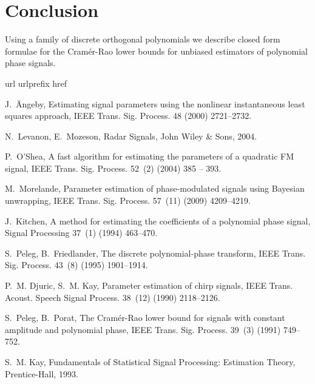 \documentclass[review]{elsarticle}
\begin{document}
 
\section{Conclusion}

Using a family of discrete orthogonal polynomials we describe closed form formulae for the Cram\'{e}r-Rao lower bounds for unbiased estimators of polynomial phase signals.



\small 
%

\begin{thebibliography}{10}
\expandafter\ifx\csname url\endcsname\relax
  \def\url#1{\texttt{#1}}\fi
\expandafter\ifx\csname urlprefix\endcsname\relax\def\urlprefix{URL }\fi
\expandafter\ifx\csname href\endcsname\relax
  \def\href#1#2{#2} \def\path#1{#1}\fi

J.~\"Angeby, Estimating signal parameters using the nonlinear instantaneous
  least squares approach, IEEE Trans. Sig. Process. 48 (2000) 2721--2732.

N.~Levanon, E.~Mozeson, Radar Signals, John Wiley \& Sons, 2004.

P.~O'Shea, A fast algorithm for estimating the parameters of a quadratic {FM}
  signal, IEEE Trans. Sig. Process. 52~(2) (2004) 385 -- 393.

M.~Morelande, Parameter estimation of phase-modulated signals using {Bayesian}
  unwrapping, IEEE Trans. Sig. Process. 57~(11) (2009) 4209--4219.

J.~Kitchen, A method for estimating the coefficients of a polynomial phase
  signal, Signal Processing 37~(1) (1994) 463--470.

S.~Peleg, B.~Friedlander, The discrete polynomial-phase transform, IEEE Trans.
  Sig. Process. 43~(8) (1995) 1901--1914.

P.~M. Djuric, S.~M. Kay, Parameter estimation of chirp signals, IEEE Trans.
  Acoust. Speech Signal Process. 38~(12) (1990) 2118--2126.

S.~Peleg, B.~Porat, The {Cram\'{e}r-Rao} lower bound for signals with constant
  amplitude and polynomial phase, IEEE Trans. Sig. Process. 39~(3) (1991)
  749--752.

S.~M. Kay, Fundamentals of Statistical Signal Processing: Estimation Theory,
  Prentice-Hall, 1993.


\end{thebibliography}
\end{document}
